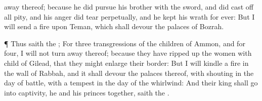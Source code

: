 {away
{} thereof; because he did
pursue his
brother with the
sword, and did cast
off all
pity, and his
anger did
tear
perpetually, and he
kept his
wrath for
ever:
But I will
send a
fire upon
Teman, which shall
devour the
palaces of
Bozrah.
\par }{\PP {}¶ Thus
saith the
{}; For
three
transgressions of the
children of
Ammon, and for
four, I will not turn
away
{} thereof; because they have ripped
up the women with
child of
Gilead, that they might
enlarge their
border:
But I will
kindle a
fire in the
wall of
Rabbah, and it shall
devour the
palaces thereof, with
shouting in the
day of
battle, with a
tempest in the
day of the
whirlwind:
And their
king shall
go into
captivity, he and his
princes
together,
saith the
{}.

}
